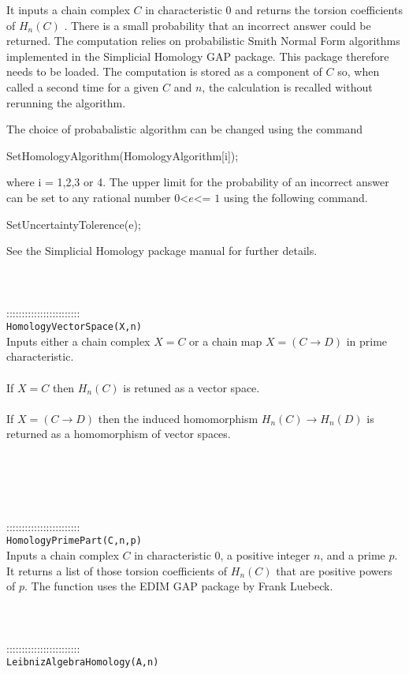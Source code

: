 \documentclass[a4paper,11pt]{report}
\begin{document}
{ It inputs a chain complex $C$ in characteristic $0$ and returns the torsion coefficients of $H_n(C)$ . There is a small probability that an incorrect answer could be returned. The
computation relies on probabilistic Smith Normal Form algorithms implemented
in the Simplicial Homology GAP package. This package therefore needs to be
loaded. The computation is stored as a component of $C$ so, when called a second time for a given $C$ and $n$, the calculation is recalled without rerunning the algorithm. 

 The choice of probabalistic algorithm can be changed using the command 

 SetHomologyAlgorithm(HomologyAlgorithm[i]);

 where i = 1,2,3 or 4. The upper limit for the probability of an incorrect
answer can be set to any rational number $0${\textless}$e${\textless}= $1$ using the following command. 

SetUncertaintyTolerence(e);

 See the Simplicial Homology package manual for further details. \\
 \\
 \\
 \\
 ::::::::::::::::::::::::\\
 \texttt{HomologyVectorSpace(X,n)}\\
 

 Inputs either a chain complex $X=C$ or a chain map $X=(C \longrightarrow D)$ in prime characteristic. \\
 \\
If $X=C$ then $H_n(C)$ is retuned as a vector space.\\
 \\
 If $X=(C \longrightarrow D)$ then the induced homomorphism $H_n(C) \longrightarrow H_n(D)$ is returned as a homomorphism of vector spaces. \\
 \\
 \\
 \\
 \\
 \\
 ::::::::::::::::::::::::\\
 \texttt{HomologyPrimePart(C,n,p)}\\
 

 Inputs a chain complex $C$ in characteristic 0, a positive integer $n$, and a prime $p$. It returns a list of those torsion coefficients of $H_n(C)$ that are positive powers of $p$. The function uses the EDIM GAP package by Frank Luebeck. \\
 \\
 \\
 \\
 ::::::::::::::::::::::::\\
 \texttt{LeibnizAlgebraHomology(A,n)}\\
 

}
\end{document}
